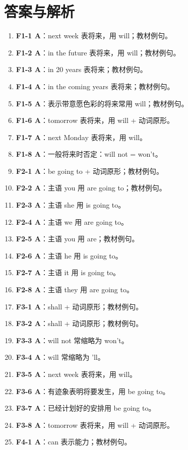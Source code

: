 \documentclass[11pt,a4paper]{ctexart}
\begin{document}
\section*{答案与解析}
\small
\begin{enumerate}[leftmargin=1.6em,itemsep=2pt]
\item \textbf{F1-1 A}：next week 表将来，用 will；教材例句。
\item \textbf{F1-2 A}：in the future 表将来，用 will；教材例句。
\item \textbf{F1-3 A}：in 20 years 表将来；教材例句。
\item \textbf{F1-4 A}：in the coming years 表将来；教材例句。
\item \textbf{F1-5 A}：表示带意愿色彩的将来常用 will；教材例句。
\item \textbf{F1-6 A}：tomorrow 表将来，用 will + 动词原形。
\item \textbf{F1-7 A}：next Monday 表将来，用 will。
\item \textbf{F1-8 A}：一般将来时否定：will not = won’t。
\item \textbf{F2-1 A}：be going to + 动词原形；教材例句。
\item \textbf{F2-2 A}：主语 you 用 are going to；教材例句。
\item \textbf{F2-3 A}：主语 she 用 is going to。
\item \textbf{F2-4 A}：主语 we 用 are going to。
\item \textbf{F2-5 A}：主语 you 用 are；教材例句。
\item \textbf{F2-6 A}：主语 he 用 is going to。
\item \textbf{F2-7 A}：主语 it 用 is going to。
\item \textbf{F2-8 A}：主语 they 用 are going to。
\item \textbf{F3-1 A}：shall + 动词原形；教材例句。
\item \textbf{F3-2 A}：shall + 动词原形；教材例句。
\item \textbf{F3-3 A}：will not 常缩略为 won’t。
\item \textbf{F3-4 A}：will 常缩略为 ’ll。
\item \textbf{F3-5 A}：next week 表将来，用 will。
\item \textbf{F3-6 A}：有迹象表明将要发生，用 be going to。
\item \textbf{F3-7 A}：已经计划好的安排用 be going to。
\item \textbf{F3-8 A}：tomorrow 表将来，用 will + 动词原形。
\item \textbf{F4-1 A}：can 表示能力；教材例句。

\end{enumerate}
\end{document}
